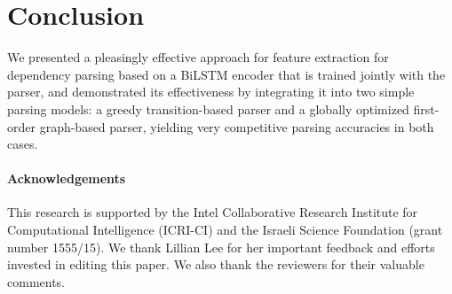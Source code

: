 \documentclass[11pt]{article}
\begin{document}
\section{Conclusion}
We presented a pleasingly effective approach for feature extraction for dependency parsing
based on a \mbox{BiLSTM} encoder that is trained jointly with the parser, and
demonstrated its effectiveness by integrating it into two simple parsing models:
a greedy transition-based parser and a globally optimized first-order
graph-based parser, yielding very competitive parsing accuracies in both cases.

\paragraph{Acknowledgements}
This research is supported by the Intel Collaborative Research Institute for
Computational Intelligence (ICRI-CI) and the Israeli Science Foundation
(grant number 1555/15). 
We thank Lillian Lee for her important feedback and efforts invested in editing this paper. We also thank the reviewers for their valuable comments.
\end{document}
